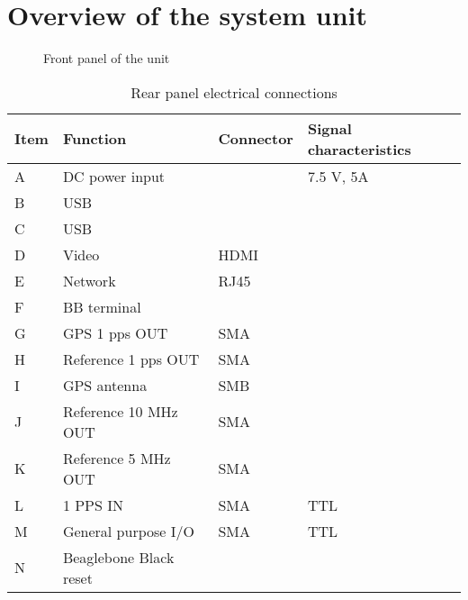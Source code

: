 
\section{Overview of the system unit}


\begin{figure}[h]
\caption{Front panel of the unit}
\end{figure}

\begin{table}
	\begin{tabular}{llll}
	Item & Function & Connector & Signal characteristics \\ \hline
	A & DC power input & & 7.5 V, 5A \\
	B & USB & & \\
	C & USB & & \\
	D & Video & HDMI & \\
	E & Network & RJ45 & \\
	F & BB terminal & & \\
	G & GPS 1 pps OUT & SMA & \\
	H & Reference 1 pps OUT & SMA & \\
	I & GPS antenna & SMB & \\
	J & Reference 10 MHz OUT& SMA & \\
	K & Reference 5 MHz OUT & SMA & \\
	L & 1 PPS IN & SMA & TTL\\
	M & General purpose I/O & SMA & TTL \\
	N & Beaglebone Black reset & &
	\end{tabular}
	\caption{Rear panel electrical connections}
\end{table}